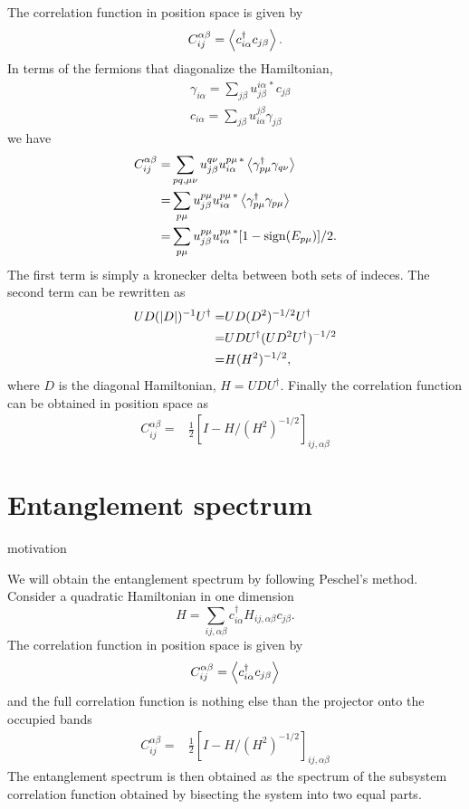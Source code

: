 \documentclass[twocolumn,amsmath,longbibliography,amssymb,superscriptaddress]{revtex4-1}
\newcommand{\carlos}[1]{{\color{red} #1}}
\begin{document}
The correlation function in position space is given by
\begin{align*}
C_{ij}^{\alpha \beta} = \expval{c_{i\alpha}^\dagger c_{j\beta}}.
\end{align*}
In terms of the fermions that diagonalize the Hamiltonian, 
\begin{align*}
& \gamma_{i\alpha} = \sum_{j\beta}u_{j\beta}^{i\alpha \, \ast} c_{j\beta} \\
& c_{i\alpha} = \sum_{j\beta} u^{j\beta}_{i\alpha} \gamma_{j\beta}
\end{align*}
we have
\begin{align*}
C_{ij}^{\alpha \beta} =& \sum_{pq,\mu\nu} u^{q\nu }_{j\beta} u^{p\mu \, \ast}_{i\alpha} \expval{\gamma^\dagger_{p\mu} \gamma_{q\nu} } \\
=&  \sum_{p\mu} u^{p\mu }_{j\beta} u^{p\mu \, \ast}_{i\alpha} \expval{\gamma^\dagger_{p\mu} \gamma_{p\mu} } \\
=&  \sum_{p\mu} u^{p\mu }_{j\beta} u^{p\mu \, \ast}_{i\alpha} [1-{\rm sign}(E_{p\mu})]/2.
\end{align*}
The first term is simply a kronecker delta between both sets of indeces. The second term can be rewritten as
\begin{align*}
UD(\abs{D})^{-1}U^\dagger =& UD(D^2)^{-1/2}U^\dagger \\
=& U D U^\dagger (U D^2 U^\dagger)^{-1/2} \\
=& H(H^2)^{-1/2},
\end{align*}
where $D$ is the diagonal Hamiltonian, $H=UDU^\dagger$. Finally the correlation function can be obtained in position space as
\begin{align*}
C_{ij}^{\alpha \beta} =& \frac{1}{2}\left[I - H/ (H^2)^{-1/2} \right]_{ij, \alpha \beta}
\end{align*}

\section{Entanglement spectrum}
\carlos{motivation}

We will obtain the entanglement spectrum by following Peschel's method. Consider a quadratic Hamiltonian in one dimension
\begin{equation}
H = \sum_{ij,\alpha\beta} c_{i\alpha}^\dagger H_{ij,\alpha \beta}c_{j\beta}.
\end{equation}
The correlation function in position space is given by
\begin{align*}
C_{ij}^{\alpha \beta} = \expval{c_{i\alpha}^\dagger c_{j\beta}}
\end{align*}
and the full correlation function is nothing else than the projector onto the occupied bands
\begin{align*}
C_{ij}^{\alpha \beta} =& \frac{1}{2}\left[I - H/ (H^2)^{-1/2} \right]_{ij, \alpha \beta}
\end{align*}
The entanglement spectrum is then obtained as the spectrum of the subsystem correlation function obtained by bisecting the system into two equal parts. 
\end{document}
